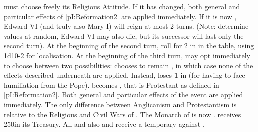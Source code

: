 \aparag[Edward VI] \ENG must choose freely its Religious Attitude.  If it has
changed, both general and particular effects of \ref{pI:Reformation2} are
applied immediately.  If it is now \CATHCO, Edward VI (and truly also Mary I)
will reign at most 2 turns. (Note: determine values at random, Edward VI may
also die, but its successor will last only the second turn).
\bparag At the beginning of the second turn, roll for 2 \REVOLT in \ENG in the
table, using 1d10-2 for localisation.
 At the beginning of the third
turn, \ENG may opt immediately to choose between two possibilities:
 \ENG chooses to remain \CATHCO, in which case none of the
effects described underneath are applied. Instead, \ENG loses {\bf 1} in \STAB
(for having to face humiliation from the Pope).
 \ENG becomes \PROTANG, that is Protestant as
defined in \ref{pI:Reformation2}.  Both general and particular effects of the
event are applied immediately.  The only difference between Anglicanism and
Protestantism is relative to the Religious and Civil Wars of \ENG.
\bparag The Monarch of \ENG is now .
\bparag \ENG receives 250\ducats in its Treasury.
\bparag All \CATHCR \MAJ and also \POR and \VEN receive a temporary \CB
against \ENG.




